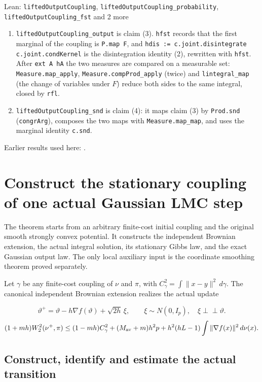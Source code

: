 \documentclass[11pt,a4paper]{report}
\begin{document}
\begin{leanbox}{Lean: \texttt{liftedOutputCoupling}, \texttt{liftedOutputCoupling\_\allowbreak{}probability}, \texttt{liftedOutputCoupling\_\allowbreak{}fst} and 2 more}
\begin{enumerate}
\item \texttt{lifted\allowbreak{}Output\allowbreak{}Coupling\_\allowbreak{}output} is claim (3). \texttt{hfst} records that the first marginal of the coupling is \texttt{P.\allowbreak{}map F}, and \texttt{hdis := c.\allowbreak{}joint.\allowbreak{}disintegrate c.\allowbreak{}joint.\allowbreak{}cond\allowbreak{}Kernel} is the disintegration identity (2), rewritten with \texttt{hfst}. After \texttt{ext A h\allowbreak{}A} the two measures are compared on a measurable set: \texttt{Measure.\allowbreak{}map\_\allowbreak{}apply}, \texttt{Measure.\allowbreak{}comp\allowbreak{}Prod\_\allowbreak{}apply} (twice) and \texttt{lintegral\_\allowbreak{}map} (the change of variables under \(F\)) reduce both sides to the same integral, closed by \texttt{rfl}.

\item \texttt{lifted\allowbreak{}Output\allowbreak{}Coupling\_\allowbreak{}snd} is claim (4): it maps claim (3) by \texttt{Prod.\allowbreak{}snd} (\texttt{congr\allowbreak{}Arg}), composes the two maps with \texttt{Measure.\allowbreak{}map\_\allowbreak{}map}, and uses the marginal identity \texttt{c.\allowbreak{}snd}.

\end{enumerate}
\end{leanbox}


Earlier results used here: \cite[Section~3.17.1]{LangevinLean2026ULASC}.
\section{\texorpdfstring{Construct the stationary coupling of one actual Gaussian LMC step}{Construct the stationary coupling of one actual Gaussian LMC step}}
\label{proof-module-AverageLMC-GaussianCanonical-lean}


The theorem starts from an arbitrary finite-cost initial coupling and the original smooth strongly convex potential. It constructs the independent Brownian extension, the actual integral solution, its stationary Gibbs law, and the exact Gaussian output law. The only local auxiliary input is the coordinate smoothing theorem proved separately.



Let \(\gamma\) be any finite-cost coupling of \(\nu\) and \(\pi\), with \(C_\gamma^2=\int\|x-y\|^2\,d\gamma\). The canonical independent Brownian extension realizes the actual update


\[\vartheta^+=\vartheta-h\nabla f(\vartheta)+\sqrt{2h}\,\xi,\qquad\xi\sim N(0,I_p),\quad\xi\perp\!\!\!\perp\vartheta.\]
\[(1+mh)W_2^2(\nu^+,\pi)\le(1-mh)C_\gamma^2+(M_{\rm av}+m)h^2p+h^2(hL-1)\int\|\nabla f(x)\|^2\,d\nu(x).\]\subsection{\texorpdfstring{Construct, identify and estimate the actual transition}{Construct, identify and estimate the actual transition}}
\label{report-step-AverageLMC-GaussianCanonical-lean-1}
\end{document}
